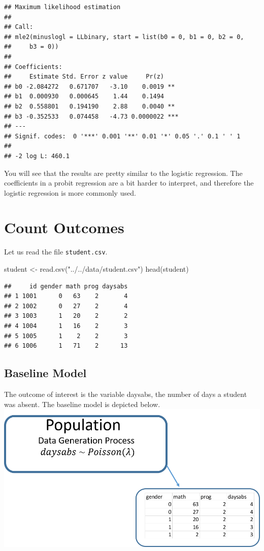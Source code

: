 \documentclass[
]{article}
\newenvironment{Shaded}{\begin{snugshade}}{\end{snugshade}}
\newcommand{\FunctionTok}[1]{\textcolor[rgb]{0.00,0.00,0.00}{#1}}
\newcommand{\NormalTok}[1]{#1}
\newcommand{\OtherTok}[1]{\textcolor[rgb]{0.56,0.35,0.01}{#1}}
\newcommand{\StringTok}[1]{\textcolor[rgb]{0.31,0.60,0.02}{#1}}
\begin{document}
\begin{verbatim}
## Maximum likelihood estimation
## 
## Call:
## mle2(minuslogl = LLbinary, start = list(b0 = 0, b1 = 0, b2 = 0, 
##     b3 = 0))
## 
## Coefficients:
##     Estimate Std. Error z value     Pr(z)    
## b0 -2.084272   0.671707   -3.10    0.0019 ** 
## b1  0.000930   0.000645    1.44    0.1494    
## b2  0.558801   0.194190    2.88    0.0040 ** 
## b3 -0.352533   0.074458   -4.73 0.0000022 ***
## ---
## Signif. codes:  0 '***' 0.001 '**' 0.01 '*' 0.05 '.' 0.1 ' ' 1
## 
## -2 log L: 460.1
\end{verbatim}

You will see that the results are pretty similar to the logistic
regression. The coefficients in a probit regression are a bit harder to
interpret, and therefore the logistic regression is more commonly used.

\hypertarget{count-outcomes}{%
\section{Count Outcomes}\label{count-outcomes}}

Let us read the file \texttt{student.csv}.

\begin{Shaded}
\begin{Highlighting}[]
\NormalTok{student }\OtherTok{\textless{}{-}} \FunctionTok{read.csv}\NormalTok{(}\StringTok{"../../data/student.csv"}\NormalTok{)}
\FunctionTok{head}\NormalTok{(student)}
\end{Highlighting}
\end{Shaded}

\begin{verbatim}
##     id gender math prog daysabs
## 1 1001      0   63    2       4
## 2 1002      0   27    2       4
## 3 1003      1   20    2       2
## 4 1004      1   16    2       3
## 5 1005      1    2    2       3
## 6 1006      1   71    2      13
\end{verbatim}

\hypertarget{baseline-model-1}{%
\subsection{Baseline Model}\label{baseline-model-1}}

The outcome of interest is the variable daysabs, the number of days a
student was absent. The baseline model is depicted below.
\includegraphics{estpic13.png}
\end{document}
